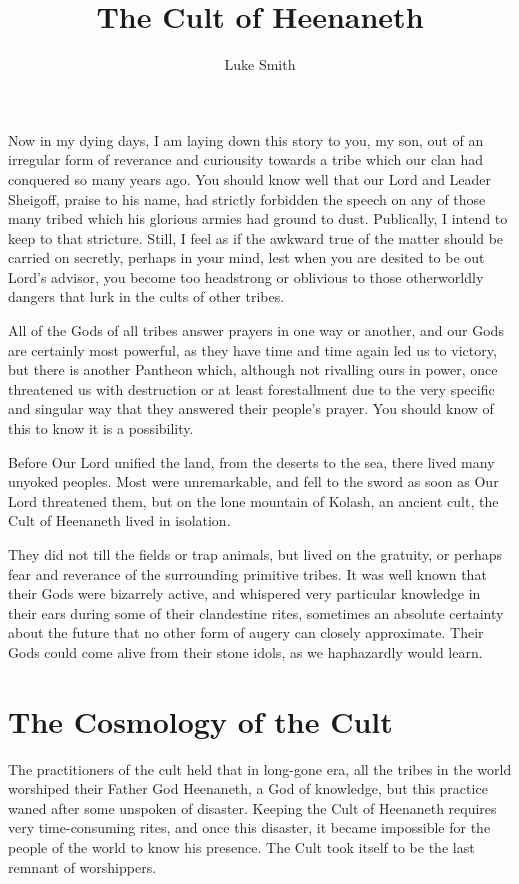 \documentclass{article}
\title{The Cult of Heenaneth}
\author{Luke Smith}
\begin{document}
\maketitle

Now in my dying days, I am laying down this story to you, my son, out of an irregular form of reverance and curiousity towards a tribe which our clan had conquered so many years ago. You should know well that our Lord and Leader Sheigoff, praise to his name, had strictly forbidden the speech on any of those many tribed which his glorious armies had ground to dust. Publically, I intend to keep to that stricture. Still, I feel as if the awkward true of the matter should be carried on secretly, perhaps in your mind, lest when you are desited to be out Lord's advisor, you become too headstrong or oblivious to those otherworldly dangers that lurk in the cults of other tribes.

All of the Gods of all tribes answer prayers in one way or another, and our Gods are certainly most powerful, as they have time and time again led us to victory, but there is another Pantheon which, although not rivalling ours in power, once threatened us with destruction or at least forestallment due to the very specific and singular way that they answered their people's prayer. You should know of this to know it is a possibility.

Before Our Lord unified the land, from the deserts to the sea, there lived many unyoked peoples. Most were unremarkable, and fell to the sword as soon as Our Lord threatened them, but on the lone mountain of Kolash, an ancient cult, the Cult of Heenaneth lived in isolation.

They did not till the fields or trap animals, but lived on the gratuity, or perhaps fear and reverance of the surrounding primitive tribes. It was well known that their Gods were bizarrely active, and whispered very particular knowledge in their ears during some of their clandestine rites, sometimes an absolute certainty about the future that no other form of augery can closely approximate. Their Gods could come alive from their stone idols, as we haphazardly would learn.


\section{The Cosmology of the Cult}

The practitioners of the cult held that in long-gone era, all the tribes in the world worshiped their Father God Heenaneth, a God of knowledge, but this practice waned after some unspoken of disaster. Keeping the Cult of Heenaneth requires very time-consuming rites, and once this disaster, it became impossible for the people of the world to know his presence. The Cult took itself to be the last remnant of worshippers.
\end{document}
